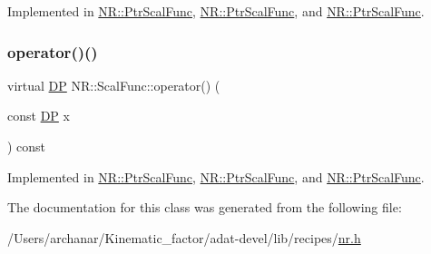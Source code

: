 Implemented in \mbox{\hyperlink{classNR_1_1PtrScalFunc_a661b2194b67e1e0e0de15389f0cea5f1}{N\+R\+::\+Ptr\+Scal\+Func}}, \mbox{\hyperlink{classNR_1_1PtrScalFunc_a661b2194b67e1e0e0de15389f0cea5f1}{N\+R\+::\+Ptr\+Scal\+Func}}, and \mbox{\hyperlink{classNR_1_1PtrScalFunc_a661b2194b67e1e0e0de15389f0cea5f1}{N\+R\+::\+Ptr\+Scal\+Func}}.

\mbox{\label{classNR_1_1ScalFunc_a7dae30ac413c03bb0acfae13b7abb57e}} 
\subsubsection{\texorpdfstring{operator()()}{operator()()}\hspace{0.1cm}{\footnotesize\ttfamily [3/3]}}
{\footnotesize\ttfamily virtual \mbox{\hyperlink{namespaceNR_af6ff762dd605ff477b8e52387253a02a}{DP}} N\+R\+::\+Scal\+Func\+::operator() (\begin{DoxyParamCaption}\item[{const \mbox{\hyperlink{namespaceNR_af6ff762dd605ff477b8e52387253a02a}{DP}}}]{x }\end{DoxyParamCaption}) const\hspace{0.3cm}{\ttfamily [pure virtual]}}



Implemented in \mbox{\hyperlink{classNR_1_1PtrScalFunc_a661b2194b67e1e0e0de15389f0cea5f1}{N\+R\+::\+Ptr\+Scal\+Func}}, \mbox{\hyperlink{classNR_1_1PtrScalFunc_a661b2194b67e1e0e0de15389f0cea5f1}{N\+R\+::\+Ptr\+Scal\+Func}}, and \mbox{\hyperlink{classNR_1_1PtrScalFunc_a661b2194b67e1e0e0de15389f0cea5f1}{N\+R\+::\+Ptr\+Scal\+Func}}.



The documentation for this class was generated from the following file\+:\begin{DoxyCompactItemize}
\item 
/\+Users/archanar/\+Kinematic\+\_\+factor/adat-\/devel/lib/recipes/\mbox{\hyperlink{adat-devel_2lib_2recipes_2nr_8h}{nr.\+h}}\end{DoxyCompactItemize}
